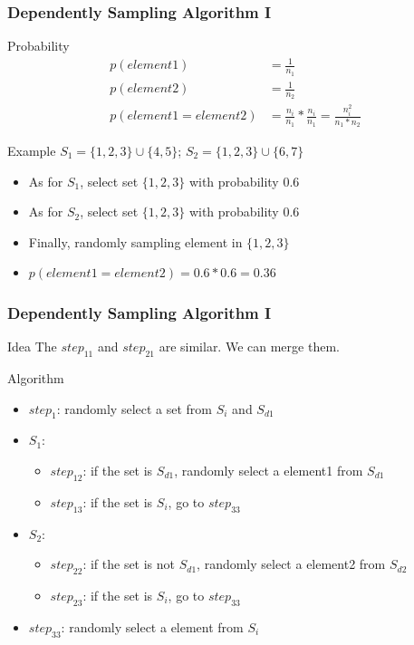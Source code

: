 \documentclass[notheorems, aspectratio=54]{beamer}
\begin{document}
\begin{frame}
    \frametitle{Dependently Sampling Algorithm I}
    \begin{block}{Probability}
        \begin{equation}
            \begin{aligned}
                p(element1) &= \frac{1}{n_1} \\
                p(element2) &= \frac{1}{n_2}\\
                p(element1 = element2) &=  \frac{n_i}{n_1}*\frac{n_i}{n_1} = \frac{n_i^2}{n_1*n_2}
            \end{aligned}
        \end{equation}
    \end{block}
    \begin{block}{Example}
        $S_1 =  \{1,2,3\} \cup \{4,5\}$; $S_2 = \{1,2,3\} \cup \{6,7\}$
        \begin{itemize}
            \item As for $S_1$, select set $\{1,2,3\}$ with probability $0.6$
            \item As for $S_2$, select set $\{1,2,3\}$ with probability $0.6$
            \item Finally, randomly sampling element in $\{1,2,3\}$
            \item $p(element1 = element2) = 0.6*0.6 = 0.36$
        \end{itemize}
    \end{block}
\end{frame}

\begin{frame}
    \frametitle{Dependently Sampling Algorithm I}
    \begin{block}{Idea}
        The $step_{11}$ and $step_{21}$ are similar. We can merge them.
    \end{block}
    \begin{block}{Algorithm}
        \begin{itemize}
            \item $step_{1}$: randomly select a set from $S_i$ and $S_{d1}$
            \item $S_1$:
            \begin{itemize}
                \item $step_{12}$: if the set is $S_{d1}$, randomly select a element1 from $S_{d1}$
                \item $step_{13}$: if the set is $S_i$, go to $step_{33}$
            \end{itemize}
            \item $S_2$:
            \begin{itemize}
                \item $step_{22}$: if the set is not $S_{d1}$, randomly select a element2 from $S_{d2}$
                \item $step_{23}$: if the set is $S_i$, go to $step_{33}$
            \end{itemize}
            \item $step_{33}$: randomly select a element from $S_i$
        \end{itemize}
    \end{block}
\end{frame}
\end{document}

